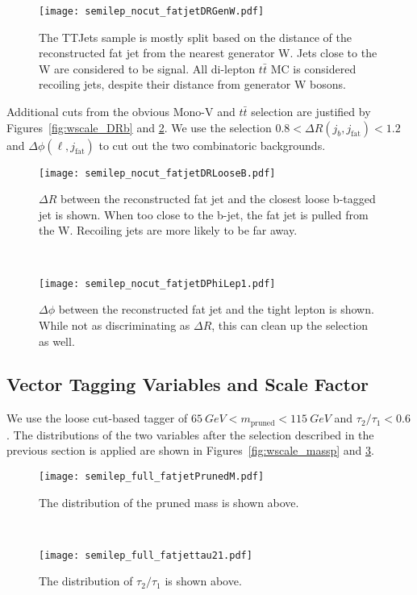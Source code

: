 \documentclass{article}
\begin{document}
\begin{figure}[h]
  \centering
  \texttt{[image: semilep\_nocut\_fatjetDRGenW.pdf]}
  \caption{The TTJets sample is mostly split based on the distance of the reconstructed fat jet
  from the nearest generator W. Jets close to the W are considered to be signal.
  All di-lepton $t\bar{t}$ MC is considered recoiling jets, despite their distance from generator W bosons.}
  \label{fig:wscale_DRGen}
\end{figure}

Additional cuts from the obvious Mono-V and $t\bar{t}$ selection are 
justified by Figures~\ref{fig:wscale_DRb} and \ref{fig:wscale_DPhiLep}.
We use the selection $0.8 < \Delta R(j_b,j_\text{fat}) < 1.2$ 
and $\Delta\phi(\ell,j_\text{fat})$ to cut out the two combinatoric backgrounds.

\begin{figure}[h]
  \centering
  \begin{minipage}{0.49\linewidth}
    \centering
    \texttt{[image: semilep\_nocut\_fatjetDRLooseB.pdf]}
    \caption{$\Delta R$ between the reconstructed fat jet and the closest loose
    b-tagged jet is shown. When too close to the b-jet, the fat jet is pulled from
    the W. Recoiling jets are more likely to be far away.}
    \label{fig:wscale_DRb}
  \end{minipage}
  ~
  \begin{minipage}{0.49\linewidth}
    \centering
    \texttt{[image: semilep\_nocut\_fatjetDPhiLep1.pdf]}
    \caption{$\Delta\phi$ between the reconstructed fat jet and the tight lepton
      is shown. While not as discriminating as $\Delta R$, this can clean up the selection
      as well.}
    \label{fig:wscale_DPhiLep}
  \end{minipage}
\end{figure}
  
\subsection{Vector Tagging Variables and Scale Factor} \label{sec:wscale_tagging}

We use the loose cut-based tagger of $\SI{65}{GeV} < m_\text{pruned} < \SI{115}{GeV}$
and $\tau_2/\tau_1 < 0.6$.
The distributions of the two variables after the selection described
in the previous section is applied are shown in
Figures~\ref{fig:wscale_massp} and \ref{fig:wscale_tau21}.

\begin{figure}[h]
  \centering
  \begin{minipage}{0.49\linewidth}
    \centering
    \texttt{[image: semilep\_full\_fatjetPrunedM.pdf]}
    \caption{The distribution of the pruned mass is shown above.}
    \label{fig:wscale_massp}
  \end{minipage}
  ~
  \begin{minipage}{0.49\linewidth}
    \centering
    \texttt{[image: semilep\_full\_fatjettau21.pdf]}
    \caption{The distribution of $\tau_2/\tau_1$ is shown above.}
    \label{fig:wscale_tau21}
  \end{minipage}
\end{figure}
  
\end{document}
